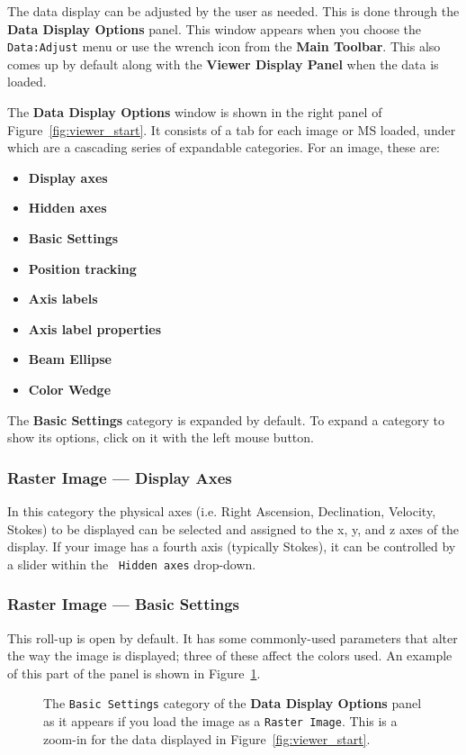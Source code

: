 The data display can be adjusted by the user as needed.  This
is done through the {\bf Data Display Options} panel.  This window
appears when you choose the {\tt Data:Adjust} menu or use the
wrench icon from the {\bf Main Toolbar}.  This also comes up
by default along with the {\bf Viewer Display Panel} when the
data is loaded.

The {\bf Data Display Options} window is shown in the right panel
of Figure~\ref{fig:viewer_start}.  It consists of a tab for each
image or MS loaded, under which are a cascading series of expandable
categories.  For an image, these are:
\begin{itemize}
   \item {\bf Display axes}
   \item {\bf Hidden axes}
   \item {\bf Basic Settings}
   \item {\bf Position tracking}
   \item {\bf Axis labels}
   \item {\bf Axis label properties}
   \item {\bf Beam Ellipse}
   \item {\bf Color Wedge}
\end{itemize}
The {\bf Basic Settings} category is expanded by
default.  To expand a category to show its options, click on it with
the left mouse button.


\subsubsection{Raster Image --- Display Axes}
In this category the physical axes (i.e. Right Ascension, Declination,
Velocity, Stokes) to be displayed can be selected and assigned to the
x, y, and z axes of the display. If your image has a fourth axis
(typically Stokes), it can be controlled by a slider within the {\tt
  Hidden axes} drop-down.

\subsubsection{Raster Image --- Basic Settings}
\label{section:display.image.raster.adjust.basic}

This roll-up is open by default.  It has some commonly-used parameters
that alter the way the image is displayed; three of these affect the
colors used. An example of this part of the panel is shown in
Figure~\ref{fig:viewer_raster_basic}.

\begin{figure}[h!]
\begin{center}
\caption{\label{fig:viewer_raster_basic} The {\tt Basic Settings}
category of the {\bf Data Display Options} panel
as it appears if you load the image as a {\tt Raster Image}.
This is a zoom-in for the data displayed in Figure~\ref{fig:viewer_start}.}
\hrulefill
\end{center}
\end{figure}

